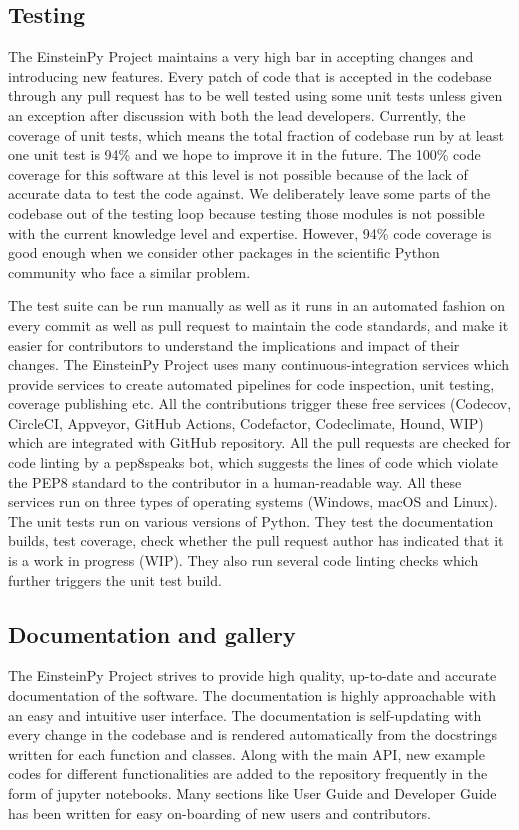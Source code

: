 \documentclass[onecolumn]{aa}
\begin{document}
\subsection{Testing} \label{subsec:testing}
The EinsteinPy Project maintains a very high bar in accepting changes and introducing new features. Every patch of code that is accepted in the codebase through any pull request has to be well tested using some unit tests unless given an exception after discussion with both the lead developers. Currently, the coverage of unit tests, which means the total fraction of codebase run by at least one unit test is 94\% and we hope to improve it in the future. The 100\% code coverage for this software at this level is not possible because of the lack of accurate data to test the code against. We deliberately leave some parts of the codebase out of the testing loop because testing those modules is not possible with the current knowledge level and expertise. However, 94\% code coverage is good enough when we consider other packages in the scientific Python community who face a similar problem.  

The test suite can be run manually as well as it runs in an automated fashion on every commit as well as pull request to maintain the code standards, and make it easier for contributors to understand the implications and impact of their changes. The EinsteinPy Project uses many continuous-integration services which provide services to create automated pipelines for code inspection, unit testing, coverage publishing etc. All the contributions trigger these free services (Codecov, CircleCI, Appveyor, GitHub Actions, Codefactor, Codeclimate, Hound, WIP) which are integrated with GitHub repository. All the pull requests are checked for code linting by a pep8speaks bot, which suggests the lines of code which violate the PEP8 standard to the contributor in a human-readable way. All these services run on three types of operating systems (Windows, macOS and Linux). The unit tests run on various versions of Python. They test the documentation builds, test coverage, check whether the pull request author has indicated that it is a work in progress (WIP). They also run several code linting checks which further triggers the unit test build.


\subsection{ Documentation and gallery} \label{subsec:doc}
The EinsteinPy Project strives to provide high quality, up-to-date and accurate documentation of the software. The documentation is highly approachable with an easy and intuitive user interface. The documentation is self-updating with every change in the codebase and is rendered automatically from the docstrings written for each function and classes. Along with the main API, new example codes for different functionalities are added to the repository frequently in the form of jupyter notebooks. Many sections like User Guide and Developer Guide has been written for easy on-boarding of new users and contributors.
	
\end{document}
